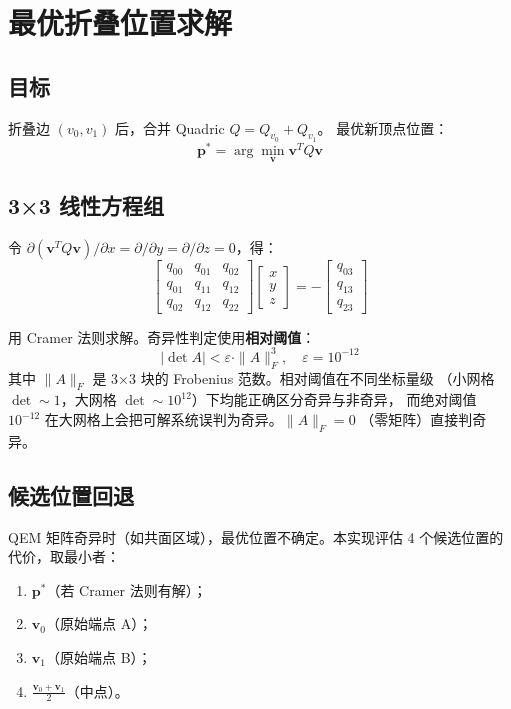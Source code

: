 \documentclass[11pt,a4paper]{article}
\begin{document}
\section{最优折叠位置求解}

\subsection{目标}

折叠边 $(v_0, v_1)$ 后，合并 Quadric $Q = Q_{v_0} + Q_{v_1}$。
最优新顶点位置：
\[
  \mathbf{p}^* = \arg\min_{\mathbf{v}} \mathbf{v}^T Q \mathbf{v}
\]

\subsection{3×3 线性方程组}

令 $\partial(\mathbf{v}^T Q \mathbf{v}) / \partial x =
\partial / \partial y = \partial / \partial z = 0$，得：
\[
  \begin{bmatrix}
    q_{00} & q_{01} & q_{02} \\
    q_{01} & q_{11} & q_{12} \\
    q_{02} & q_{12} & q_{22}
  \end{bmatrix}
  \begin{bmatrix} x \\ y \\ z \end{bmatrix}
  =
  -\begin{bmatrix} q_{03} \\ q_{13} \\ q_{23} \end{bmatrix}
\]

用 Cramer 法则求解。奇异性判定使用\textbf{相对阈值}：
\[
  |\det A| < \varepsilon \cdot \|A\|_F^3, \quad \varepsilon = 10^{-12}
\]
其中 $\|A\|_F$ 是 3$\times$3 块的 Frobenius 范数。相对阈值在不同坐标量级
（小网格 $\det \sim 1$，大网格 $\det \sim 10^{12}$）下均能正确区分奇异与非奇异，
而绝对阈值 $10^{-12}$ 在大网格上会把可解系统误判为奇异。$\|A\|_F = 0$
（零矩阵）直接判奇异。

\subsection{候选位置回退}

QEM 矩阵奇异时（如共面区域），最优位置不确定。本实现评估 4 个候选位置的
代价，取最小者：
\begin{enumerate}
  \item $\mathbf{p}^*$（若 Cramer 法则有解）；
  \item $\mathbf{v}_0$（原始端点 A）；
  \item $\mathbf{v}_1$（原始端点 B）；
  \item $\frac{\mathbf{v}_0 + \mathbf{v}_1}{2}$（中点）。
\end{enumerate}
\end{document}
